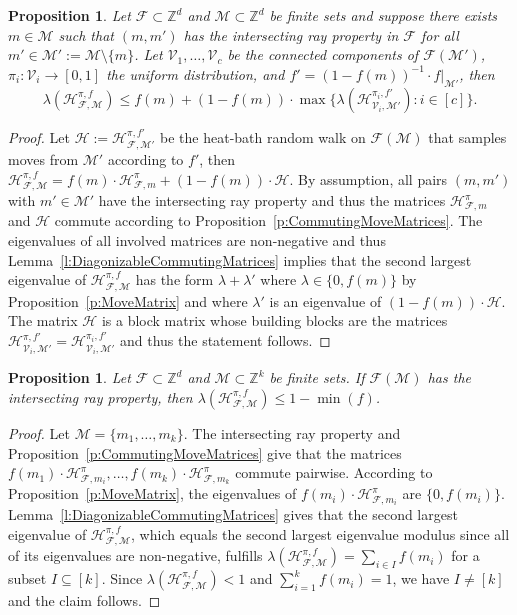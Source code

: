 \documentclass[11pt]{amsart}
\newtheorem{prop}[thm]{Proposition}
\theoremstyle{definition}
\numberwithin{equation}{section}
\newcommand{\ring}[1]{\ensuremath{\mathbb{#1}}}
\renewcommand{\>}{\rangle}
\newcommand{\<}{\langle}
\newcommand{\0}{\mathbf{0}}
\newcommand{\1}{\mathbf{1}}
\newcommand{\2}{\mathbf{2}}
\newcommand\ZZ{\ring{Z}}
\newcommand\cF{{\mathcal F}}
\newcommand\cH{{\mathcal H}}
\newcommand\cM{{\mathcal M}}
\newcommand\cV{{\mathcal V}}
\newcommand{\heatbath}[4]{\mathcal{H}^{#1,#2}_{#3,#4}}
\newcommand{\heatbathmove}[3]{\mathcal{H}^{#1}_{#2,#3}}
\begin{document}
\begin{prop}
Let $\cF\subset\ZZ^d$ and $\cM\subset\ZZ^d$ be finite sets and suppose
there exists $m\in\cM$ such that $(m,m')$ has the intersecting ray
property in $\cF$ for all $m'\in\cM':=\cM\setminus\{m\}$. Let
$\cV_1,\dots,\cV_c$ be the connected components of
$\cF(\cM')$, $\pi_i:\cV_i\to[0,1]$ the uniform distribution, and
$f'=(1-f(m))^{-1}\cdot f|_{\cM'}$, then
\begin{equation*}
\lambda(\heatbath{\pi}{f}{\cF}{\cM})\le
f(m)+(1-f(m))\cdot\max\{\lambda(\heatbath{\pi_i}{f'}{\cV_i}{\cM'}):i\in
[c]\}.
\end{equation*}
\end{prop}
\begin{proof}
Let $\cH:=\heatbath{\pi}{f'}{\cF}{\cM'}$
be the heat-bath random walk on $\cF(\cM)$ that samples moves from
$\cM'$ according to $f'$, then
$\heatbath{\pi}{f}{\cF}{\cM}=f(m)\cdot\heatbathmove{\pi}{\cF}{m}+(1-f(m))\cdot
\cH$.
By assumption, all pairs $(m,m')$ with $m'\in\cM'$ have the intersecting ray
property and thus the matrices $\heatbathmove{\pi}{\cF}{m}$ and
$\cH$ commute according to
Proposition~\ref{p:CommutingMoveMatrices}. The eigenvalues of all
involved matrices are non-negative and thus
Lemma~\ref{l:DiagonizableCommutingMatrices} implies that the second largest
eigenvalue of $\heatbath{\pi}{f}{\cF}{\cM}$ has the form
$\lambda+\lambda'$ where $\lambda\in\{0,f(m)\}$ by
Proposition~\ref{p:MoveMatrix} and where $\lambda'$
is an eigenvalue of $(1-f(m))\cdot\cH$.
The matrix $\cH$ is a block matrix
whose building blocks are the matrices
$\heatbath{\pi}{f'}{\cV_i}{\cM'}=\heatbath{\pi_i}{f'}{\cV_i}{\cM'}$
and thus the statement follows.
\end{proof}

\begin{prop}\label{p:UpperSLEMBound}
Let $\cF\subset\ZZ^d$ and $\cM\subset\ZZ^k$ be finite sets. If
$\cF(\cM)$ has the intersecting ray
property, then $\lambda(\heatbath{\pi}{f}{\cF}{\cM})\le 1-\min(f)$.
\end{prop}
\begin{proof}
Let $\cM=\{m_1,\dots,m_k\}$. The intersecting ray property and
Proposition~\ref{p:CommutingMoveMatrices} give that
the matrices
$f(m_1)\cdot\heatbathmove{\pi}{\cF}{m_i},\dots,f(m_k)\cdot\heatbathmove{\pi}{\cF}{m_k}$
commute pairwise. According to Proposition~\ref{p:MoveMatrix}, the
eigenvalues of
$f(m_i)\cdot\heatbathmove{\pi}{\cF}{m_i}$ are $\{0,f(m_i)\}$.
Lemma~\ref{l:DiagonizableCommutingMatrices} gives that the second
largest eigenvalue of $\heatbath{\pi}{f}{\cF}{\cM}$, which equals the
second largest eigenvalue modulus since all of its eigenvalues are
non-negative, fulfills
$\lambda(\heatbath{\pi}{f}{\cF}{\cM})=\sum_{i\in
I}f(m_i)$ for a subset $I\subseteq[k]$. Since
$\lambda(\heatbath{\pi}{f}{\cF}{\cM})<1$ and $\sum_{i=1}^kf(m_i)=1$, we
have $I\neq[k]$ and the claim follows.
\end{proof}
\end{document}
